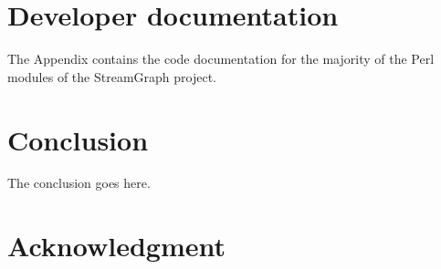 \documentclass[journal]{IEEEtran}
\begin{document}
\newpage




\section{Developer documentation}

\noindent The Appendix contains the code documentation for the
majority of the Perl modules of the StreamGraph project.





\section{Conclusion}
\noindent The conclusion goes here.

\appendices


\section*{Acknowledgment}
\end{document}
